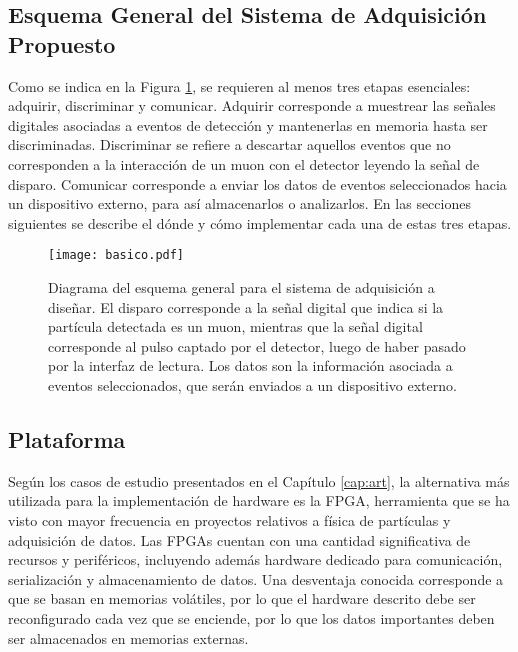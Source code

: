 	

	\subsection{Esquema General del Sistema de Adquisición Propuesto}
		Como se indica en la Figura \ref{img:diagrama}, se requieren al menos tres etapas esenciales: adquirir, discriminar y comunicar. Adquirir corresponde a muestrear las señales digitales asociadas a eventos de detección y mantenerlas en memoria hasta ser discriminadas. Discriminar se refiere a descartar aquellos eventos que no corresponden a la interacción de un muon con el detector leyendo la señal de disparo. Comunicar corresponde a enviar los datos de eventos seleccionados hacia un dispositivo externo, para así almacenarlos o analizarlos. En las secciones siguientes se describe el dónde y cómo implementar cada una de estas tres etapas.
		
		\begin{figure}[h]
			\centering
			\texttt{[image: basico.pdf]}
			\caption{Diagrama del esquema general para el sistema de adquisición a diseñar. El disparo corresponde a la señal digital que indica si la partícula detectada es un muon, mientras que la señal digital corresponde al pulso captado por el detector, luego de haber pasado por la interfaz de lectura. Los datos son la información asociada a eventos seleccionados, que serán enviados a un dispositivo externo.}
			\label{img:diagrama}
		\end{figure}
	
	\subsection{Plataforma}
		Según los casos de estudio presentados en el Capítulo \ref{cap:art}, la alternativa más utilizada para la implementación de hardware  es la FPGA, herramienta que se ha visto con mayor frecuencia en proyectos relativos a física de partículas y adquisición de datos. Las FPGAs cuentan con una cantidad significativa de recursos y periféricos, incluyendo además hardware dedicado para comunicación, serialización y almacenamiento de datos. Una desventaja conocida corresponde a que se basan en memorias volátiles, por lo que el hardware descrito debe ser reconfigurado cada vez que se enciende, por lo que los datos importantes deben ser almacenados en memorias externas.
		
